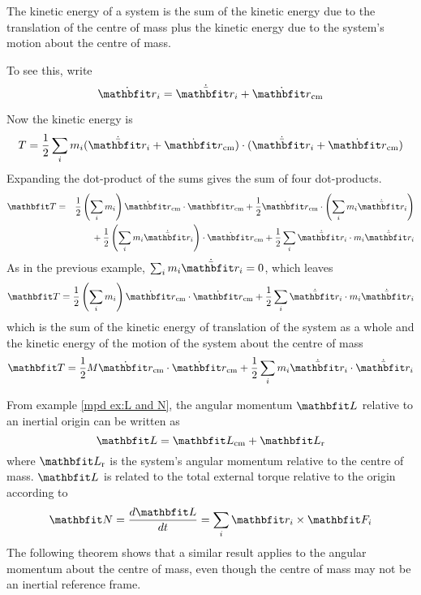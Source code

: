 \begin{example}
The kinetic energy of a system is the sum of the kinetic energy due to the
translation of the centre of mass plus the kinetic energy due to the system's
motion about the centre of mass.

To see this, write
$$\dot{\vect{r}}_i=\dot{\bar{\vect{r}}}_i+\dot{\vect{r}}_{\rm cm}$$

Now the kinetic energy is
$$T=\frac{1}{2}\sum_i m_i
(\dot{\bar{\vect{r}}}_i+\dot{\vect{r}}_{\rm cm})\cdot
(\dot{\bar{\vect{r}}}_i+\dot{\vect{r}}_{\rm cm})$$
Expanding the dot-product of the sums gives the sum of four
dot-products. 
\begin{eqnarray}
\vect{T}&=&
\frac{1}{2}\left(\sum_i m_i\right)\dot{\vect{r}}_{\rm cm}\cdot\dot{\vect{r}}_{\rm cm}
+\frac{1}{2}\dot{\vect{r}}_{\rm cm}\cdot\left(\sum_im_i\dot{\bar{\vect{r}}}_i\right)
\\
&&{}+\frac{1}{2}\left(\sum_i m_i\dot{\bar{\vect{r}}}_i\right)\cdot\dot{\vect{r}}_{\rm cm}
+\frac{1}{2}\sum_i \dot{\bar{\vect{r}}}_i\cdot m_i\dot{\bar{\vect{r}}}_i
\end{eqnarray}
As in the previous example, $\sum_i m_i\dot{\bar{\vect{r}}}_i=0$, which
leaves
$$\vect{T}
=\frac{1}{2}\left(\sum_i m_i\right)\dot{\vect{r}}_{\rm cm}\cdot\dot{\vect{r}}_{\rm cm}
+\frac{1}{2}\sum_i \dot{\bar{\vect{r}}}_i\cdot m_i\dot{\bar{\vect{r}}}_i$$
which is the sum of the kinetic energy of translation of the system as a
whole and the kinetic energy of the motion of the system about the 
centre of mass
$$\vect{T}
=\frac{1}{2}M\dot{\vect{r}}_{\rm cm}\cdot\dot{\vect{r}}_{\rm cm}
+\frac{1}{2}\sum_i m_i\dot{\bar{\vect{r}}}_i\cdot \dot{\bar{\vect{r}}}_i$$
\end{example}

From example \ref{mpd ex:L and N}, the angular momentum $\vect{L}$ relative
to an inertial origin can be written as
$$\vect{L}=\vect{L}_{\rm cm}+\vect{L}_{\rm r}$$
where $\vect{L}_{\rm r}$ is the system's angular momentum relative to the
centre of mass.  $\vect{L}$ is related to the total external torque relative
to the origin according to
$$\vect{N}=\der{\vect{L}}{t}=\sum_i\vect{r}_i\times\vect{F}_i$$
The following theorem shows that a similar result applies to the angular
momentum about the centre of mass, even though the centre of mass may not be
an inertial reference frame.

